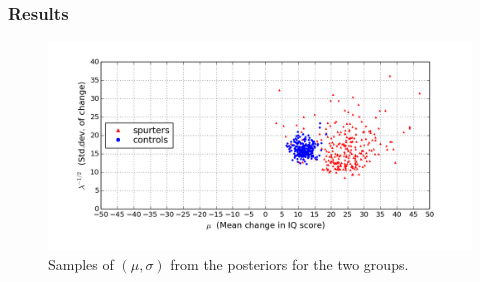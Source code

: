 \documentclass[12pt]{article}
\begin{document}


\subsubsection*{Results}

\begin{figure}
  \begin{center}
    \includegraphics[width=1\textwidth]{pygmalion-posteriors.png}
  \end{center}
  \caption{Samples of $(\mu,\sigma)$ from the posteriors for the two groups.}
  \label{figure:pygmalion-posteriors}
\end{figure}
\end{document}
